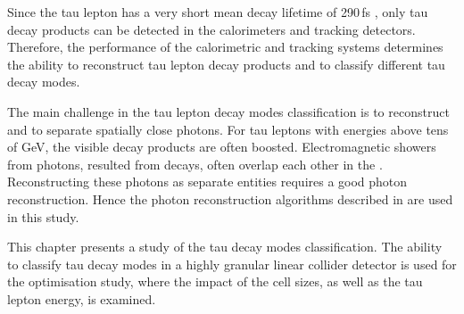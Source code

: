 Since the tau lepton has a very short mean decay lifetime of 290\,fs \cite{Abreu:1991jn}, only tau decay products can be detected in the calorimeters and tracking detectors. Therefore, the performance of the calorimetric and tracking systems determines the ability to reconstruct tau lepton decay products and to classify different tau decay modes.


The main challenge in the tau lepton decay modes  classification is to reconstruct and to separate spatially close photons. For  tau leptons with energies above tens of GeV, the visible decay products are often boosted.  Electromagnetic showers from photons, resulted from \Ppizero decays, often overlap each other in the \ECAL.  Reconstructing these photons as separate entities requires a good photon reconstruction. Hence the photon reconstruction algorithms described in  are used in this study.







%

This chapter presents a study of the tau decay modes classification. The ability to classify tau decay modes in a highly granular linear collider detector is used for the \ECAL optimisation study, where the impact of  the \ECAL cell sizes,  as well as the tau lepton energy, is examined.

